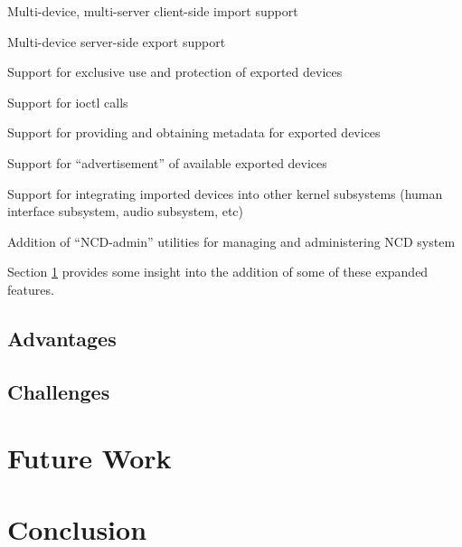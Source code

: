 \documentclass[11pt,twocolumn]{article}
\newenvironment{packed_item}{
\begin{itemize}
  \setlength{\itemsep}{1pt}
  \setlength{\parskip}{0pt}
  \setlength{\parsep}{0pt}
}{\end{itemize}}
\begin{document}
\begin{packed_item}
\item Multi-device, multi-server client-side import support
\item Multi-device server-side export support
\item Support for exclusive use and protection of exported devices
\item Support for ioctl calls
\item Support for providing and obtaining metadata for exported
  devices
\item Support for ``advertisement'' of available exported devices
\item Support for integrating imported devices into other kernel
  subsystems (human interface subsystem, audio subsystem, etc)
\item Addition of ``NCD-admin'' utilities for managing and administering
  NCD system
\end{packed_item}

Section \ref{sec:futurework} provides some insight into the addition
of some of these expanded features.

\subsection{Advantages}
\label{sec:advantages}

\subsection{Challenges}
\label{sec:challenges}

\section{Future Work}
\label{sec:futurework}

\section{Conclusion}
\label{sec:conclusion}


\end{document}
